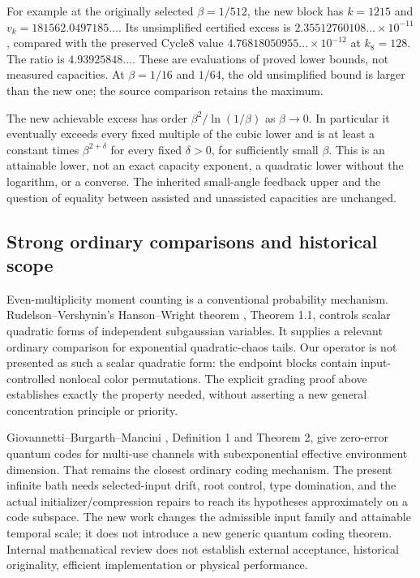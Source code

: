 \documentclass[11pt]{article}
\begin{document}
For example at the originally selected \(\beta=1/512\), the new block
has \(k=1215\) and \(v_k=181562.0497185\ldots\). Its unsimplified
certified excess is \(2.35512760108\ldots\times10^{-11}\), compared with
the preserved Cycle8 value \(4.76818050955\ldots\times10^{-12}\)
at \(k_8=128\). The ratio is \(4.93925848\ldots\).
These are evaluations of proved lower bounds, not measured capacities.
At \(\beta=1/16\) and \(1/64\), the old unsimplified bound is larger
than the new one; the source comparison retains the maximum.

The new achievable excess has order
\(\beta^2/\ln(1/\beta)\) as \(\beta\to0\). In particular it eventually
exceeds every fixed multiple of the cubic lower and is at least a
constant times \(\beta^{2+\delta}\) for every fixed \(\delta>0\), for
sufficiently small \(\beta\). This is an attainable lower, not an exact
capacity exponent, a quadratic lower without the logarithm, or a converse.
The inherited small-angle feedback upper and the question of equality
between assisted and unassisted capacities are unchanged.

\subsection{Strong ordinary comparisons and historical scope}

Even-multiplicity moment counting is a conventional probability mechanism.
Rudelson--Vershynin's Hanson--Wright theorem \cite{RV}, Theorem 1.1,
controls scalar quadratic forms of independent subgaussian variables.
It supplies a relevant ordinary comparison for exponential quadratic-chaos
tails. Our operator is not presented as such a scalar quadratic form:
the endpoint blocks contain input-controlled nonlocal color permutations.
The explicit grading proof above establishes exactly the property needed,
without asserting a new general concentration principle or priority.

Giovannetti--Burgarth--Mancini \cite{GBM}, Definition 1 and Theorem 2,
give zero-error quantum codes for multi-use channels with subexponential
effective environment dimension. That remains the closest ordinary coding
mechanism. The present infinite bath needs selected-input drift, root control,
type domination, and the actual initializer/compression repairs to reach its
hypotheses approximately on a code subspace.
The new work changes the admissible input family and attainable temporal
scale; it does not introduce a new generic quantum coding theorem.
Internal mathematical review does not establish external acceptance,
historical originality, efficient implementation or physical performance.
\end{document}
